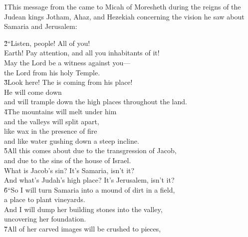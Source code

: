 


\v{1}This message from the  came to Micah of Moresheth during the reigns of the Judean kings Jotham, Ahaz, and Hezekiah concerning the vision he saw about Samaria and Jerusalem:

\begin{poetry}
\poeml \v{2}``Listen, people! All of you! \\
\poemll    Earth! Pay attention, and all you inhabitants of it! \\
\poeml May the Lord  be a witness against you--- \\
\poemll    the Lord from his holy Temple. \\
\poeml \v{3}Look here! The  is coming from his place! \\
\poemll    He will come down \\
\poemlll       and will trample down the high places throughout the land. \\
\poeml \v{4}The mountains will melt under him \\
\poemll    and the valleys will split apart, \\
\poeml like wax in the presence of fire \\
\poemll    and like water gushing down a steep incline. \\
\poeml \v{5}All this comes about due to the transgression of Jacob, \\
\poemll    and due to the sins of the house of Israel. \\
\poeml What is Jacob's sin? It's Samaria, isn't it? \\
\poemll    And what's Judah's high place? It's Jerusalem, isn't it? \\
\poeml \v{6}``So I will turn Samaria into a mound of dirt in a field, \\
\poemll    a place to plant vineyards. \\
\poeml And I will dump her building stones into the valley, \\
\poemll    uncovering her foundation. \\
\poeml \v{7}All of her carved images will be crushed to pieces, \\

\end{poetry}
